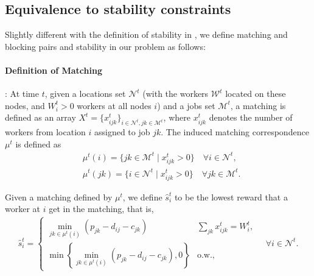 \documentclass[trsc,nonblindrev]{informs3noheader}
\begin{document}
\subsection{Equivalence to stability constraints}

Slightly different with the definition of stability in  \citep{baiou2000stable}, we define matching and blocking pairs and stability in our problem as follows:

\paragraph{Definition of Matching}: At time $t$, given a locations set $\mathcal{N}^t$ (with the workers $\mathcal{W}^t$ located on these nodes, and $W_i^t>0$ workers at all nodes $i$) and a jobs set $\mathcal{M}^t$, a matching is defined as an array $X^t = \{x_{ijk}^t\}_{i\in \mathcal{N}^t,jk\in \mathcal{M}^t}$, where $x_{ijk}^t$ denotes the number of workers from location $i$ assigned to job $jk$. The induced matching correspondence $\mu^t$ is defined as
\begin{align*}
    & \mu^t(i) = \{jk \in \mathcal{M}^t \mid x_{ijk}^t > 0\} \quad \forall i\in \mathcal{N}^t, \\
    & \mu^t(jk) = \{i \in \mathcal{N}^t \mid x^t_{ijk} > 0\} \quad \forall jk\in \mathcal{M}^t.
\end{align*}

Given a matching defined by $\mu^t$, we define $\hat{s}^t_i$ to be the lowest reward that a worker at $i$ get in the matching, that is,
\begin{align}
    \hat{s}_i^t =
    \begin{cases}
    \min_{jk\in \mu^t(i)} \left(p_{jk}-d_{ij}-c_{jk}\right) & \sum_{jk}x_{ijk}^t = W_i^t,\\
    \min \left\{\min_{jk\in \mu^t(i)} \left(p_{jk}-d_{ij}-c_{jk}\right),0\right\} & \text{o.w.},
    \end{cases}
    \quad \forall i\in \mathcal{N}^t \label{definition s hat}.
\end{align}
\end{document}
